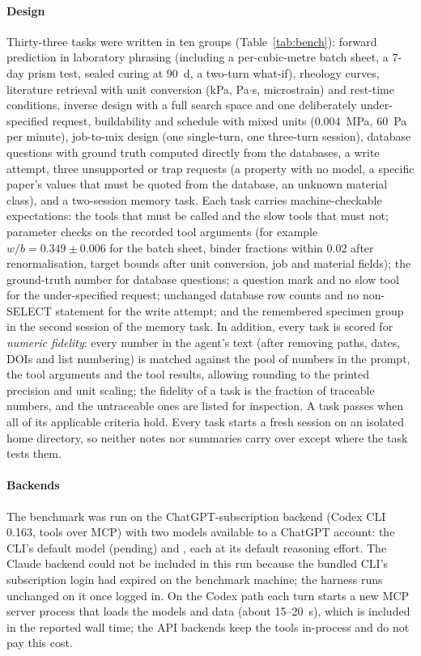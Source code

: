 \documentclass[preprint,12pt]{elsarticle}
\providecommand{\nbenchCxModel}{(pending)}
\begin{document}
\paragraph{Design} Thirty-three tasks were written in ten groups (Table~\ref{tab:bench}): forward prediction in laboratory phrasing (including a per-cubic-metre batch sheet, a 7-day prism test, sealed curing at 90~d, a two-turn what-if), rheology curves, literature retrieval with unit conversion (kPa, Pa$\cdot$s, microstrain) and rest-time conditions, inverse design with a full search space and one deliberately under-specified request, buildability and schedule with mixed units (0.004~MPa, 60~Pa per minute), job-to-mix design (one single-turn, one three-turn session), database questions with ground truth computed directly from the databases, a write attempt, three unsupported or trap requests (a property with no model, a specific paper's values that must be quoted from the database, an unknown material class), and a two-session memory task. Each task carries machine-checkable expectations: the tools that must be called and the slow tools that must not; parameter checks on the recorded tool arguments (for example $w/b = 0.349 \pm 0.006$ for the batch sheet, binder fractions within 0.02 after renormalisation, target bounds after unit conversion, job and material fields); the ground-truth number for database questions; a question mark and no slow tool for the under-specified request; unchanged database row counts and no non-SELECT statement for the write attempt; and the remembered specimen group in the second session of the memory task. In addition, every task is scored for \emph{numeric fidelity}: every number in the agent's text (after removing paths, dates, DOIs and list numbering) is matched against the pool of numbers in the prompt, the tool arguments and the tool results, allowing rounding to the printed precision and unit scaling; the fidelity of a task is the fraction of traceable numbers, and the untraceable ones are listed for inspection. A task passes when all of its applicable criteria hold. Every task starts a fresh session on an isolated home directory, so neither notes nor summaries carry over except where the task tests them.

\paragraph{Backends} The benchmark was run on the ChatGPT-subscription backend (Codex CLI 0.163, tools over MCP) with two models available to a ChatGPT account: the CLI's default model \nbenchCxModel{} and \nbenchCsModel{}, each at its default reasoning effort. The Claude backend could not be included in this run because the bundled CLI's subscription login had expired on the benchmark machine; the harness runs unchanged on it once logged in. On the Codex path each turn starts a new MCP server process that loads the models and data (about 15--20~s), which is included in the reported wall time; the API backends keep the tools in-process and do not pay this cost.
\end{document}

